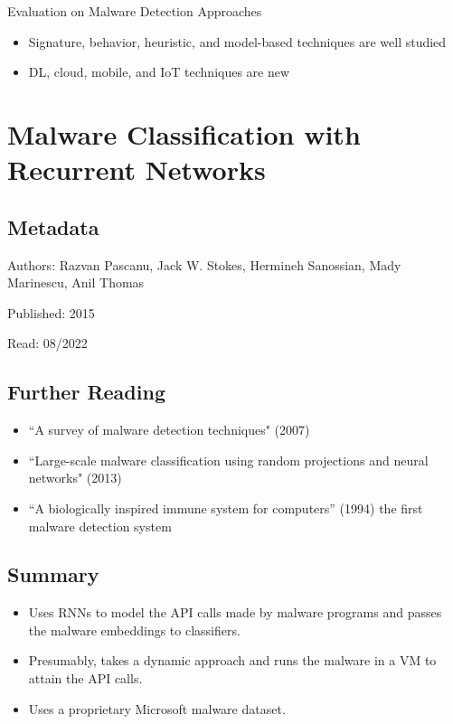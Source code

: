 \documentclass{article}
\begin{document}
Evaluation on Malware Detection Approaches
\begin{itemize}
\item Signature, behavior, heuristic, and model-based techniques are well studied
\item DL, cloud, mobile, and IoT techniques are new
\end{itemize}

\pagebreak


\section*{Malware Classification with Recurrent Networks}

\subsection*{Metadata}

\noindent Authors: Razvan Pascanu, Jack W. Stokes, Hermineh Sanossian, Mady Marinescu, Anil Thomas

\noindent Published: 2015

\noindent Read: 08/2022

\subsection*{Further Reading}
\begin{itemize}
\item ``A survey of malware detec­tion techniques" (2007)
\item ``Large-scale malware classification using random projections and neural networks" (2013)
\item ``A biologically inspired immune system for computers'' (1994) the first malware detection system
\end{itemize}

\subsection*{Summary}
\begin{itemize}
\item Uses RNNs to model the API calls made by malware programs and passes the malware embeddings to classifiers.
\item Presumably, takes a dynamic approach and runs the malware in a VM to attain the API calls.
\item Uses a proprietary Microsoft malware dataset.
\end{itemize}
\end{document}
